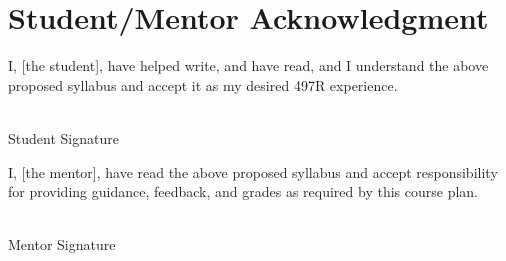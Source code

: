 \documentclass[12pt]{article}
\begin{document}
\section{Student/Mentor Acknowledgment}
\label{sec:acknowledgement}

I, [the student], have helped write, and have read, and I understand the above proposed syllabus and accept it as my desired 497R experience.

\vspace{2em}

\noindent \makebox[2.5in]{\hrulefill} \hspace {1.0in}\makebox[2.5in]{\hrulefill} \\
Student Signature  \\

\bigskip

I, [the mentor], have read the above proposed syllabus and accept responsibility for providing guidance, feedback, and grades as required by this course plan.

\vspace{2em}

\noindent \makebox[2.5in]{\hrulefill} \hspace {1.0in}\makebox[2.5in]{\hrulefill} \\
Mentor Signature  \\
\end{document}

